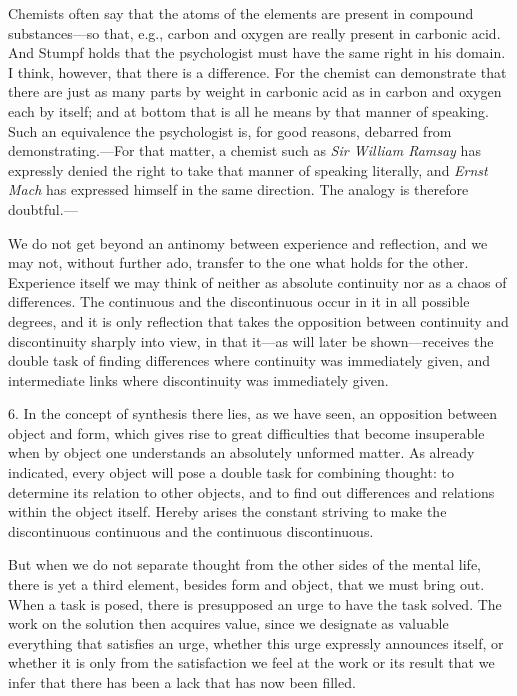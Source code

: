 \documentclass[12pt,a4paper]{book}
\newcommand{\opage}[1]{\marginnote{\footnotesize\textit{[#1]}}}
\begin{document}
Chemists often say that the atoms of the elements are present in
compound substances---so that, e.g., carbon and oxygen are really
present in carbonic acid. And Stumpf holds that the psychologist must
have the same right in his domain. I think, however, that there is a
difference. For the chemist can demonstrate that there are just as many
parts by weight in carbonic acid as in carbon and oxygen each by itself;
and at bottom that is all he means by that manner of speaking. Such an
equivalence the psychologist is, for good reasons, debarred from
demonstrating.---For that matter, a chemist such as \emph{Sir William
Ramsay} has expressly denied the right to take that manner of speaking
literally, and \emph{Ernst Mach} has expressed himself in the same
direction. The analogy is therefore doubtful.---

We do not get beyond an antinomy between experience and reflection, and
we may not, without further ado, transfer to the one what holds for the
other. Experience itself we may think of neither as absolute continuity
nor as a chaos of differences. The continuous and the discontinuous
occur in it in all possible degrees, and it is only reflection that
takes the opposition between continuity and discontinuity sharply into
view, in that it---as will later be shown---receives the double task of
finding differences where continuity was immediately given, and
intermediate links where discontinuity was immediately given.

6. In the concept of synthesis there lies, as we have seen, an
\opage{20}opposition between object and form, which gives rise to great
difficulties that become insuperable when by object one understands an
absolutely unformed matter. As already indicated, every object will pose
a double task for combining thought: to determine its relation to other
objects, and to find out differences and relations within the object
itself. Hereby arises the constant striving to make the discontinuous
continuous and the continuous discontinuous.

But when we do not separate thought from the other sides of the mental
life, there is yet a third element, besides form and object, that we
must bring out. When a task is posed, there is presupposed an urge to
have the task solved. The work on the solution then acquires value, since
we designate as valuable everything that satisfies an urge, whether this
urge expressly announces itself, or whether it is only from the
satisfaction we feel at the work or its result that we infer that there
has been a lack that has now been filled.
\end{document}
